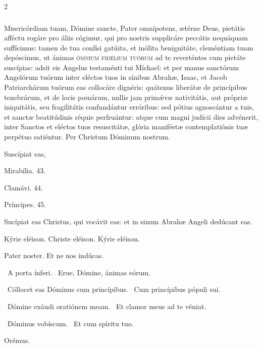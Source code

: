 \documentclass[9pt,twoside]{extarticle}
\begin{document}
\begin{multicols}{2}
\subsubsection*{\center {}}
\lettrine{M}isericórdiam tuam, Dómine sancte, Pater omnípotens, ætérne Deus, pietátis afféctu rogáre pro áliis cógimur, qui pro nostris supplicáre peccátis nequáquam suffícimus: tamen de tua confísi gatúita, et inólita benignitáte, cleméntiam tuam depóscimus, ut ánimas \textsc{ómnium fidélium tuórum} ad te reverténtes cum pietáte suscípias: adsit eis Angelus testaménti tui Míchael: et per manus sanctórum Angelórum tuórum inter eléctos tuos in sínibus Abrahæ, Isaac, et Jacob Patriarchárum tuórum eas collocáre dignéris: quátenus liberátæ de princípibus tenebrárum, et de locis pœnárum, nullis jam primǽvæ nativitátis, aut própriæ iniquitátis, seu fragilitátis confundántur erróribus: sed pótius agnoscántur a tuis, et sanctæ beatitúdinis réquie perfruántur: atque cum magni judícii dies advénerit, inter Sanctos et eléctos tuos resuscitátæ, glória maniféstæ contemplatiónis tuæ perpétuo satiéntur. Per Christum Dóminum nostrum.

\begin{tightlist}{}
\item {} Suscípiat eas, 
\item {} Mirabília. 43.
\item {} Clamávi. 44.
\item {} Príncipes. 45.
\item {} Sucípiat eas Christus, qui vocávit eas: et in sinum Abrahæ Angeli dedúcant eas.
\item Kýrie eléison. Christe eléison. Kýrie eléison.
\item Pater noster. Et ne nos indúcas.
\item {}~A porta ínferi. ~Erue, Dómine, ánimas eórum.
\item {}~Cóllocet eas Dóminus cum princípibus. ~Cum princípibus pópuli sui.
\item {}~Dómine exáudi oratiónem meam. ~Et clamor meus ad te véniat.
\item {}~Dóminus vobíscum. ~Et cum spíritu tuo.
\item Orémus. \hfill {}
\end{tightlist}


\end{multicols}
\end{document}
